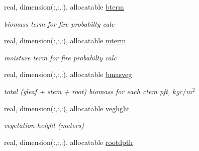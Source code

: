 \begin{DoxyCompactItemize}
\item 
\hypertarget{structctem__statevars_1_1veg__rot_a59d1e9d2ef25aab0fef2f1ac9fb887f8}{}real, dimension(\+:,\+:,\+:), allocatable \hyperlink{structctem__statevars_1_1veg__rot_a59d1e9d2ef25aab0fef2f1ac9fb887f8}{bterm}\label{structctem__statevars_1_1veg__rot_a59d1e9d2ef25aab0fef2f1ac9fb887f8}

\begin{DoxyCompactList}\small\item\em biomass term for fire probabilty calc \end{DoxyCompactList}\item 
\hypertarget{structctem__statevars_1_1veg__rot_a73855320b87e34a6b4e5982b4fa3476f}{}real, dimension(\+:,\+:,\+:), allocatable \hyperlink{structctem__statevars_1_1veg__rot_a73855320b87e34a6b4e5982b4fa3476f}{mterm}\label{structctem__statevars_1_1veg__rot_a73855320b87e34a6b4e5982b4fa3476f}

\begin{DoxyCompactList}\small\item\em moisture term for fire probabilty calc \end{DoxyCompactList}\item 
\hypertarget{structctem__statevars_1_1veg__rot_ae0675746c2a15212d1c79d72ecc9e54d}{}real, dimension(\+:,\+:,\+:), allocatable \hyperlink{structctem__statevars_1_1veg__rot_ae0675746c2a15212d1c79d72ecc9e54d}{bmasveg}\label{structctem__statevars_1_1veg__rot_ae0675746c2a15212d1c79d72ecc9e54d}

\begin{DoxyCompactList}\small\item\em total (gleaf + stem + root) biomass for each ctem pft, $kg c/m^2$ \end{DoxyCompactList}\item 
\hypertarget{structctem__statevars_1_1veg__rot_ab71314c5891431794e8390785cd0c0fc}{}real, dimension(\+:,\+:,\+:), allocatable \hyperlink{structctem__statevars_1_1veg__rot_ab71314c5891431794e8390785cd0c0fc}{veghght}\label{structctem__statevars_1_1veg__rot_ab71314c5891431794e8390785cd0c0fc}

\begin{DoxyCompactList}\small\item\em vegetation height (meters) \end{DoxyCompactList}\item 
\hypertarget{structctem__statevars_1_1veg__rot_aca39c048200ed6df9951955024d7e035}{}real, dimension(\+:,\+:,\+:), allocatable \hyperlink{structctem__statevars_1_1veg__rot_aca39c048200ed6df9951955024d7e035}{rootdpth}\label{structctem__statevars_1_1veg__rot_aca39c048200ed6df9951955024d7e035}


\end{DoxyCompactItemize}
